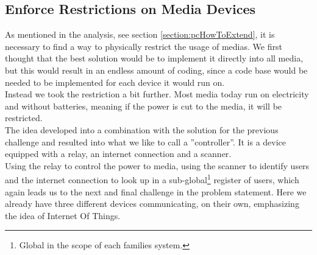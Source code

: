 \subsection{Enforce Restrictions on Media Devices}
As mentioned in the analysis, see section \ref{section:pcHowToExtend}, it is necessary to find a way to physically restrict the usage of medias. We first thought that the best solution would be to implement it directly into all media, but this would result in an endless amount of coding, since a code base would be needed to be implemented for each device it would run on.\\
Instead we took the restriction a bit further. Most media today run on electricity and without batteries, meaning if the power is cut to the media, it will be restricted.\\
The idea developed into a combination with the solution for the previous challenge and resulted into what we like to call a ''controller''. It is a device equipped with a relay, an internet connection and a scanner.\\
Using the relay to control the power to media, using the scanner to identify users and the internet connection to look up in a sub-global\footnote{Global in the scope of each families system.} register of users, which again leads us to the next and final challenge in the problem statement. Here we already have three different devices communicating, on their own, emphasizing the idea of Internet Of Things.

